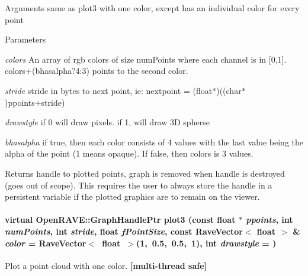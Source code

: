Arguments same as plot3 with one color, except has an individual color for every point 
\begin{DoxyParams}{Parameters}
\item[{\em colors}]An array of rgb colors of size numPoints where each channel is in \mbox{[}0,1\mbox{]}. colors+(bhasalpha?4:3) points to the second color. \item[{\em stride}]stride in bytes to next point, ie: nextpoint = (float$\ast$)((char$\ast$)ppoints+stride) \item[{\em drawstyle}]if 0 will draw pixels. if 1, will draw 3D spherse \item[{\em bhasalpha}]if true, then each color consists of 4 values with the last value being the alpha of the point (1 means opaque). If false, then colors is 3 values. \end{DoxyParams}
\begin{DoxyReturn}{Returns}
handle to plotted points, graph is removed when handle is destroyed (goes out of scope). This requires the user to always store the handle in a persistent variable if the plotted graphics are to remain on the viewer. 
\end{DoxyReturn}
\hypertarget{classOpenRAVE_1_1EnvironmentBase_a390a0a4590d91f0994d6bf2781688266}{
\paragraph[{plot3}]{\setlength{\rightskip}{0pt plus 5cm}virtual OpenRAVE::GraphHandlePtr plot3 (const float $\ast$ {\em ppoints}, \/  int {\em numPoints}, \/  int {\em stride}, \/  float {\em fPointSize}, \/  const RaveVector$<$ float $>$ \& {\em color} = {\ttfamily RaveVector$<$~float~$>$(1,~0.5,~0.5,~1)}, \/  int {\em drawstyle} = {})}\hfill}
\label{classOpenRAVE_1_1EnvironmentBase_a390a0a4590d91f0994d6bf2781688266}


Plot a point cloud with one color. {\bfseries \mbox{[}multi-\/thread safe\mbox{]}} 


